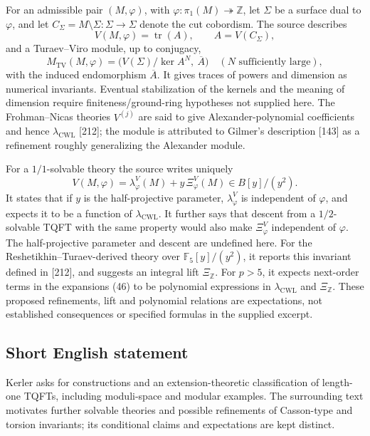 \documentclass[11pt]{article}
\newcommand{\Z}{\mathbb{Z}}
\newcommand{\F}{\mathbb{F}}
\begin{document}
For an admissible pair \((M,\varphi)\), with \(\varphi:\pi_1(M)\twoheadrightarrow\Z\), let \(\Sigma\) be a surface dual to \(\varphi\), and let \(C_\Sigma=M\setminus\Sigma:\Sigma\to\Sigma\) denote the cut cobordism. The source describes
\[V(M,\varphi)=\operatorname{tr}(A),\qquad A=V(C_\Sigma),\]
and a Turaev--Viro module, up to conjugacy,
\[M_{\mathrm{TV}}(M,\varphi)=\bigl(V(\Sigma)/\ker A^N,\ \overline A\bigr)\quad(N\text{ sufficiently large}),\]
with the induced endomorphism \(\overline A\). It gives traces of powers and dimension as numerical invariants. Eventual stabilization of the kernels and the meaning of dimension require finiteness/ground-ring hypotheses not supplied here. The Frohman--Nicas theories \(V^{(j)}\) are said to give Alexander-polynomial coefficients and hence \(\lambda_{\mathrm{CWL}}\) [212]; the module is attributed to Gilmer's description [143] as a refinement roughly generalizing the Alexander module.

For a \(1/1\)-solvable theory the source writes uniquely
\[V(M,\varphi)=\lambda^V_\varphi(M)+y\,\Xi^V_\varphi(M)\in B[y]/(y^2).\]
It states that if \(y\) is the half-projective parameter, \(\lambda^V_\varphi\) is independent of \(\varphi\), and expects it to be a function of \(\lambda_{\mathrm{CWL}}\). It further says that descent from a \(1/2\)-solvable TQFT with the same property would also make \(\Xi^V_\varphi\) independent of \(\varphi\). The half-projective parameter and descent are undefined here. For the Reshetikhin--Turaev-derived theory over \(\F_5[y]/(y^2)\), it reports this invariant defined in [212], and suggests an integral lift \(\Xi_{\Z}\). For \(p>5\), it expects next-order terms in the expansions (46) to be polynomial expressions in \(\lambda_{\mathrm{CWL}}\) and \(\Xi_{\Z}\). These proposed refinements, lift and polynomial relations are expectations, not established consequences or specified formulas in the supplied excerpt.
\subsection{Short English statement}
Kerler asks for constructions and an extension-theoretic classification of length-one TQFTs, including moduli-space and modular examples. The surrounding text motivates further solvable theories and possible refinements of Casson-type and torsion invariants; its conditional claims and expectations are kept distinct.
\end{document}
